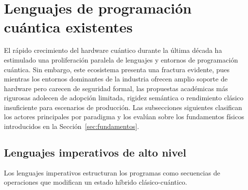 \section{Lenguajes de programación cuántica existentes}
\label{sec:estadodelarte}

El rápido crecimiento del hardware cuántico durante la última década ha estimulado una proliferación paralela de lenguajes y entornos de programación cuántica. Sin embargo, este ecosistema presenta una fractura evidente, pues mientras los entornos dominantes de la industria ofrecen amplio soporte de hardware pero carecen de seguridad formal, las propuestas académicas más rigurosas adolecen de adopción limitada, rigidez semántica o rendimiento clásico insuficiente para escenarios de producción. Las subsecciones siguientes clasifican los actores principales por paradigma y los evalúan sobre los fundamentos físicos introducidos en la Sección~\ref{sec:fundamentos}.

\subsection{Lenguajes imperativos de alto nivel}
\label{subsec:imperativos}

Los lenguajes imperativos estructuran los programas como secuencias de operaciones que modifican un estado híbrido clásico-cuántico.

